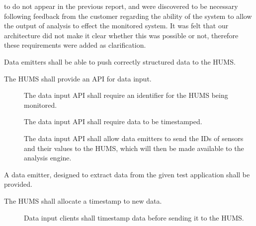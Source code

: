  to  do not appear in the previous report, and were discovered to be necessary following feedback from the customer regarding the ability of the system to allow the output of analysis to effect the monitored system. It was felt that our architecture did not make it clear whether this was possible or not, therefore these requirements were added as clarification.
\begin{description}[leftmargin=1.3cm, itemsep=0.3cm]
  	\item[\fr{1}]  Data emitters shall be able to push correctly structured data 	to the HUMS.
	\begin{description}[leftmargin=1.3cm]
		 \item[\fr{1.1}] The HUMS shall provide an API for data input.
		\begin{description}
			  \item[] The data input API shall require an identifier 				for the HUMS being monitored.

 			 \item[] The data input API shall require data to be
 		 	timestamped.

 			 \item[] The data input API shall allow data emitters
 		 	to send the IDs of sensors and their values to the HUMS, 				which will 	then be made available to the analysis engine.
		\end{description}
 		 \item[\fr{1.2}] A data emitter, designed to extract data from the given 		test application shall be provided.
	\end{description}
	\item[\fr{2}]  The HUMS shall allocate a timestamp to new data.
	\begin{description}
	 	 \item[]Data input clients shall timestamp data before
 		sending it to the HUMS.
		

\end{description}
\end{description}
